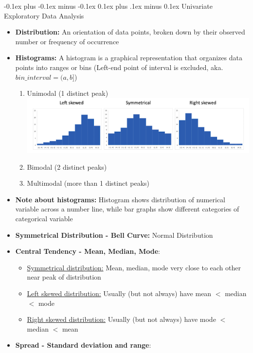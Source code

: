 \documentclass[landscape]{article}
\makeatletter
\renewcommand{\subsection}{\@startsection{subsection}{2}{0mm}%
  {-0.1ex plus -0.1ex minus -0.1ex}%
  {0.1ex plus .1ex minus 0.1ex}%
{\normalfont\scriptsize\bfseries}}
\makeatother
\begin{document}
\begin{multicols*}{5}
    \subsection{Univariate Exploratory Data Analysis}
    \begin{itemize}
      \item \textbf{Distribution:} An orientation of data points, broken down by their observed number or frequency of occurrence
      \item \textbf{Histograms:} A histogram is a graphical representation that organizes data points into ranges or bins (Left-end point of interval is excluded, aka. $bin\_interval = (a,b]$)
      \begin{enumerate}
        \item Unimodal (1 distinct peak)
        \includegraphics[width=0.9\linewidth]{3_skewed.png}
        \item Bimodal (2 distinct peaks)
        \item Multimodal (more than 1 distinct peaks)
      \end{enumerate}
      \item \textbf{Note about histograms:} Histogram shows distribution of numerical variable across a number line, while bar graphs show different categories of categorical variable
      \item \textbf{Symmetrical Distribution - Bell Curve:} Normal Distribution
      \item \textbf{Central Tendency - Mean, Median, Mode}:
      \begin{itemize}
        \item \underline{Symmetrical distribution:} Mean, median, mode very close to each other near peak of distribution
        \item \underline{Left skewed distribution:} Usually (but not always) have mean $<$ median $<$ mode
        \item \underline{Right skewed distribution:} Usually (but not always) have mode $<$ median $<$ mean
      \end{itemize}
      \item \textbf{Spread - Standard deviation and range}:
      \begin{itemize}

\end{itemize}
\end{itemize}
\end{multicols*}
\end{document}
